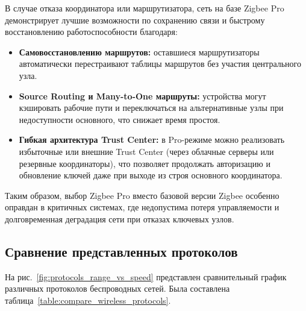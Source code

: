 \documentclass[14pt, a4paper]{extreport}
\begin{document}
В случае отказа координатора или маршрутизатора, сеть на базе Zigbee Pro демонстрирует лучшие возможности по сохранению связи и быстрому восстановлению работоспособности \cite{Fault_Tolerance_ZigBee} благодаря:
\begin{itemize}
  \item \textbf{Самовосстановлению маршрутов:} оставшиеся маршрутизаторы автоматически перестраивают таблицы маршрутов без участия центрального узла.
  \item \textbf{Source Routing и Many-to-One маршруты:} устройства могут кэшировать рабочие пути и переключаться на альтернативные узлы при недоступности основного, что снижает время простоя.
  \item \textbf{Гибкая архитектура Trust Center:} в Pro-режиме можно реализовать избыточные или внешние Trust Center (через облачные серверы или резервные координаторы), что позволяет продолжать авторизацию и обновление ключей даже при выходе из строя основного координатора.
\end{itemize}

Таким образом, выбор Zigbee Pro вместо базовой версии Zigbee особенно оправдан в критичных системах, где недопустима потеря управляемости и долговременная деградация сети при отказах ключевых узлов.  




\subsection{Сравнение представленных протоколов}
На рис.~\ref{fig:protocols_range_vs_speed} представлен сравнительный график различных протоколов беспроводных сетей. Была составлена таблица~\ref{table:compare_wireless_protocols}.
\end{document}

